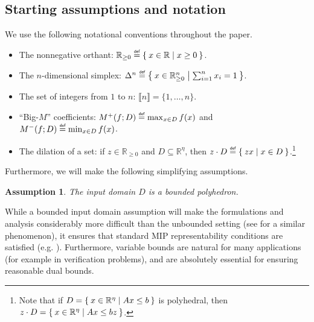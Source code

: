 \documentclass[smallextended]{svjour3}
\newcommand{\blue}[1]{{#1}}
\newcommand{\bbR}{\mathbb{R}}
\newcommand{\supp}{\operatorname{supp}}
\newcommand\defeq{\mathrel{\overset{\makebox[0pt]{\mbox{\normalfont\tiny\sffamily def}}}{=}}}
\newtheorem{assumption}{Assumption}
\newcommand{\Authornote}[3]{{\small\textcolor{#2}{\sf$<${  #1: #3}$>$}}}
\newcommand{\cnote}[1]{\Authornote{Christian}{ForestGreen}{#1}}
\begin{document}
\subsection{Starting assumptions and notation} \label{sec:assumptions}
We use the following notational conventions throughout the paper.
\begin{itemize}
    \item The nonnegative orthant: $\bbR_{\geq 0} \defeq \Set{x \in \bbR | x \geq 0}$.
    \item The \blue{$n$}-dimensional simplex: $\Delta^{\blue{n}} \defeq \Set{ x \in \bbR^{\blue{n}}_{\geq 0} | \sum_{i=1}^{\blue{n}} x_i = 1}$.
    \item The set of integers from $1$ to $n$: $\llbracket n \rrbracket = \{1, \ldots, n\}$.
    \item ``Big-$M$'' coefficients: $M^+(f;D) \defeq \max_{x \in D} f(x)$ and $M^-(f;D) \defeq \min_{x \in D} f(x)$.
    \item The dilation of a set: if $z \in \bbR_{\geq 0}$ and $D \subseteq \bbR^\eta$, then $z \cdot D \defeq \Set{ z x | x \in D}$.\footnote{Note that if $D = \Set{x \in \mathbb{R}^\eta | Ax \leq b}$ is polyhedral, then $z \cdot D = \Set{x \in \mathbb{R}^\eta | Ax \leq bz}$.}
\end{itemize}

Furthermore, we will make the following simplifying assumptions.

\begin{assumption}
    The input domain $D$ is a bounded polyhedron.
\end{assumption}

While a bounded input domain assumption will make the formulations and analysis considerably more difficult than the unbounded setting (see \cite{Atamturk:2018} for a similar phenomenon), it ensures that standard MIP representability conditions are satisfied (e.g. \cite[Section 11]{Vielma:2015}). Furthermore, variable bounds are natural for many applications (for example in verification problems), and are absolutely essential for ensuring reasonable dual bounds.
\end{document}

